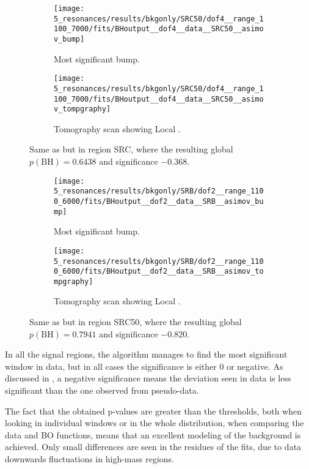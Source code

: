 \begin{figure}[ht!]
    \centering
    \begin{subfigure}[h]{0.49\linewidth}
        \centering
        \texttt{[image: 5\_resonances/results/bkgonly/SRC50/dof4\_\_range\_1100\_7000/fits/BHoutput\_\_dof4\_\_data\_\_SRC50\_\_asimov\_bump]}
        \caption{Most significant bump.}
    \end{subfigure}
    \hfill
    \begin{subfigure}[h]{0.49\linewidth}
        \centering
        \texttt{[image: 5\_resonances/results/bkgonly/SRC50/dof4\_\_range\_1100\_7000/fits/BHoutput\_\_dof4\_\_data\_\_SRC50\_\_asimov\_tompgraphy]}
        \caption{Tomography scan showing Local \pval.}
    \end{subfigure}
    \caption{Same as \Fig{\ref{fig:results:results:bkgonly:bh:SR}} but in region SRC, where the resulting global \(p(\text{BH}) = 0.6438\) and significance \(-0.368\).}
    \label{fig:results:results:bkgonly:bh:SRC}
\end{figure}

\begin{figure}[ht!]
    \centering
    \begin{subfigure}[h]{0.49\linewidth}
        \centering
        \texttt{[image: 5\_resonances/results/bkgonly/SRB/dof2\_\_range\_1100\_6000/fits/BHoutput\_\_dof2\_\_data\_\_SRB\_\_asimov\_bump]}
        \caption{Most significant bump.}
    \end{subfigure}
    \hfill
    \begin{subfigure}[h]{0.49\linewidth}
        \centering
        \texttt{[image: 5\_resonances/results/bkgonly/SRB/dof2\_\_range\_1100\_6000/fits/BHoutput\_\_dof2\_\_data\_\_SRB\_\_asimov\_tompgraphy]}
        \caption{Tomography scan showing Local \pval.}
    \end{subfigure}
    \caption{Same as \Fig{\ref{fig:results:results:bkgonly:bh:SR}} but in region SRC50, where the resulting global \(p(\text{BH}) = 0.7941\) and significance \(-0.820\).}
    \label{fig:results:results:bkgonly:bh:SRB}
\end{figure}

In all the signal regions, the \bh algorithm manages to find the most significant window in data, but in all cases the significance is either 0 or negative. As discussed in \Sect{\ref{subsec:strategy:stat_treatment:bh}}, a negative significance means the deviation seen in data is less significant than the one observed from pseudo-data.

The fact that the obtained p-values are greater than the thresholds, both when looking in individual windows or in the whole distribution, when comparing the data and \ac{BO} functions, means that an excellent modeling of the background is achieved. Only small differences are seen in the residues of the fits, due to data downwards fluctuations in high-mass regions.



